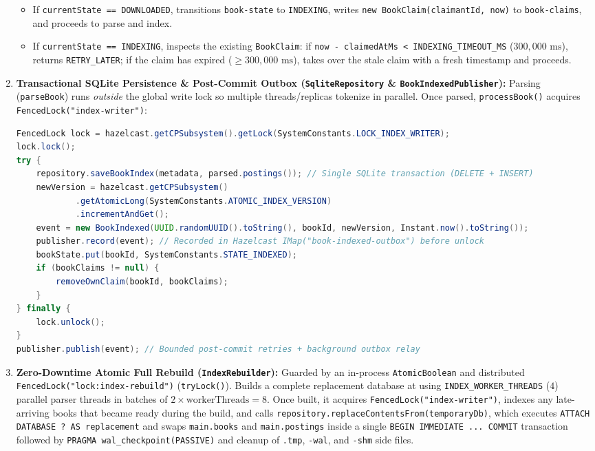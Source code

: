 \documentclass[10pt,a4paper]{article}
\begin{document}
\begin{enumerate}[leftmargin=*,nosep]
\begin{itemize}[nosep]
        \item If \texttt{currentState == DOWNLOADED}, transitions \texttt{book-state} to \texttt{INDEXING}, writes \texttt{new BookClaim(claimantId, now)} to \texttt{book-claims}, and proceeds to parse and index.
        \item If \texttt{currentState == INDEXING}, inspects the existing \texttt{BookClaim}: if \texttt{now - claimedAtMs < INDEXING\_TIMEOUT\_MS} ($300,000\text{ ms}$), returns \texttt{RETRY\_LATER}; if the claim has expired ($\ge 300,000\text{ ms}$), takes over the stale claim with a fresh timestamp and proceeds.
    \end{itemize}
    \item \textbf{Transactional SQLite Persistence \& Post-Commit Outbox (\texttt{SqliteRepository} \& \texttt{BookIndexedPublisher}):} Parsing (\texttt{parseBook}) runs \emph{outside} the global write lock so multiple threads/replicas tokenize in parallel. Once parsed, \texttt{processBook()} acquires \texttt{FencedLock("index-writer")}:
\begin{lstlisting}[language=Java,caption={Coordinated SQLite commit and post-commit outbox recording in \texttt{IndexingOrchestrator.java}.}]
FencedLock lock = hazelcast.getCPSubsystem().getLock(SystemConstants.LOCK_INDEX_WRITER);
lock.lock();
try {
    repository.saveBookIndex(metadata, parsed.postings()); // Single SQLite transaction (DELETE + INSERT)
    newVersion = hazelcast.getCPSubsystem()
            .getAtomicLong(SystemConstants.ATOMIC_INDEX_VERSION)
            .incrementAndGet();
    event = new BookIndexed(UUID.randomUUID().toString(), bookId, newVersion, Instant.now().toString());
    publisher.record(event); // Recorded in Hazelcast IMap("book-indexed-outbox") before unlock
    bookState.put(bookId, SystemConstants.STATE_INDEXED);
    if (bookClaims != null) {
        removeOwnClaim(bookId, bookClaims);
    }
} finally {
    lock.unlock();
}
publisher.publish(event); // Bounded post-commit retries + background outbox relay
\end{lstlisting}
    \item \textbf{Zero-Downtime Atomic Full Rebuild (\texttt{IndexRebuilder}):} Guarded by an in-process \texttt{AtomicBoolean} and distributed \texttt{FencedLock("lock:index-rebuild")} (\texttt{tryLock()}). Builds a complete replacement database at  using \texttt{INDEX\_WORKER\_THREADS} ($4$) parallel parser threads in batches of $2 \times \text{workerThreads} = 8$. Once built, it acquires \texttt{FencedLock("index-writer")}, indexes any late-arriving books that became ready during the build, and calls \texttt{repository.replaceContentsFrom(temporaryDb)}, which executes \texttt{ATTACH DATABASE ? AS replacement} and swaps \texttt{main.books} and \texttt{main.postings} inside a single \texttt{BEGIN IMMEDIATE ... COMMIT} transaction followed by \texttt{PRAGMA wal\_checkpoint(PASSIVE)} and cleanup of \texttt{.tmp}, \texttt{-wal}, and \texttt{-shm} side files.
\end{enumerate}
\end{document}
